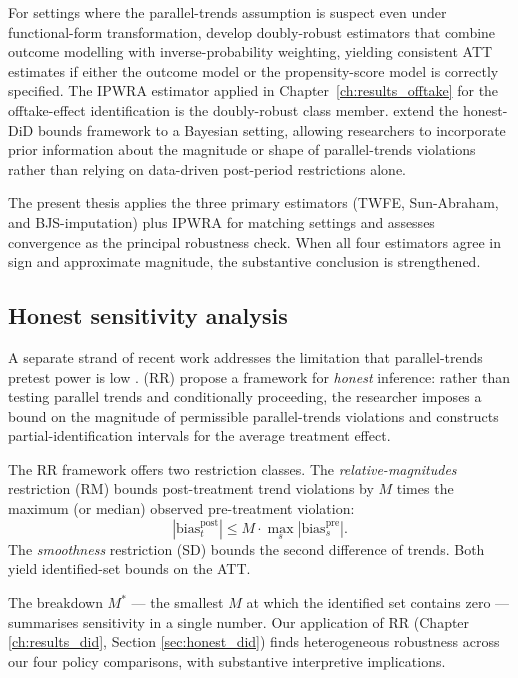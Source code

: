 For settings where the parallel-trends assumption is suspect even under functional-form transformation, \cite{santanna2020doubly} develop doubly-robust estimators that combine outcome modelling with inverse-probability weighting, yielding consistent ATT estimates if either the outcome model or the propensity-score model is correctly specified. The IPWRA estimator applied in Chapter~\ref{ch:results_offtake} for the offtake-effect identification is the doubly-robust class member. \cite{kwonroth2024bayesian} extend the honest-DiD bounds framework to a Bayesian setting, allowing researchers to incorporate prior information about the magnitude or shape of parallel-trends violations rather than relying on data-driven post-period restrictions alone.

The present thesis applies the three primary estimators (TWFE, Sun-Abraham, and BJS-imputation) plus IPWRA for matching settings and assesses convergence as the principal robustness check. When all four estimators agree in sign and approximate magnitude, the substantive conclusion is strengthened.

\subsection{Honest sensitivity analysis}

A separate strand of recent work addresses the limitation that parallel-trends pretest power is low \cite{roth2022pretest}. \cite{rambachan2023more} (RR) propose a framework for \emph{honest} inference: rather than testing parallel trends and conditionally proceeding, the researcher imposes a bound on the magnitude of permissible parallel-trends violations and constructs partial-identification intervals for the average treatment effect.

The RR framework offers two restriction classes. The \emph{relative-magnitudes} restriction (RM) bounds post-treatment trend violations by $M$ times the maximum (or median) observed pre-treatment violation:
\begin{equation}
|\text{bias}^{\text{post}}_t| \leq M \cdot \max_s |\text{bias}^{\text{pre}}_s|.
\label{eq:lit_rr_rm}
\end{equation}
The \emph{smoothness} restriction (SD) bounds the second difference of trends. Both yield identified-set bounds on the ATT.

The breakdown $M^*$ --- the smallest $M$ at which the identified set contains zero --- summarises sensitivity in a single number. Our application of RR (Chapter \ref{ch:results_did}, Section \ref{sec:honest_did}) finds heterogeneous robustness across our four policy comparisons, with substantive interpretive implications.

